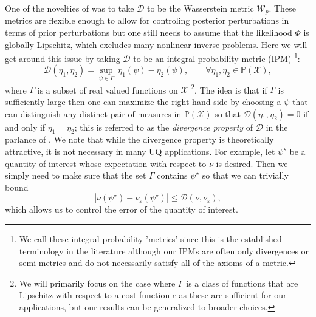 \documentclass[final]{siamart171218}
\newcommand{\mcl}{\mathcal}
\newcommand{\mbb}{\mathbb}
\newcommand{\veps}{\varepsilon}
\newcommand{\mX}{\mcl{X}}
\newcommand{\PP}{\mbb{P}}
\newcommand{\D}{\mathcal{D}}
\newcommand{\W}{\mathcal{W}}
\begin{document}
One of the novelties of \cite{sprungk} was to take $\D$ to be the Wasserstein metric $\W_p$.
These metrics are flexible enough to allow for
controling posterior perturbations in terms of prior perturbations but
one still needs to assume that the likelihood $\Phi$ is globally Lipschitz,
which excludes many nonlinear inverse problems. Here we will get around
this issue by taking $\D$ to be an integral probability metric (IPM)
\footnote{We call these integral probability 'metrics' since this is 
the established terminology in the literature although our IPMs are often 
only divergences or semi-metrics and do not necessarily satisfy all of the axioms of a metric.}:
\begin{equation}\label{IPD}
  \D(\eta_1, \eta_2) = \sup_{\psi \in \Gamma} \: \eta_1( \psi)
  - \eta_2( \psi), \qquad \forall  \eta_1,\eta_2 \in \PP(\mX),
\end{equation}
where $\Gamma$ is a subset of real valued functions on $\mX$ \footnote{We will primarily 
focus on the case where $\Gamma$ is a class of functions that are Lipschitz with respect to a 
cost function $c$ as these are sufficient for our applications, but our results can be generalized to broader choices.}.
The idea is that if $\Gamma$ is sufficiently large then one can maximize
the right hand side by choosing a $\psi$ that can distinguish any distinct pair
of measures in $\PP(\mX)$ so that $\D(\eta_1, \eta_2) = 0$ if and only if
$\eta_1 = \eta_2$; this is referred to as the {\it divergence property} of $\D$ in
the parlance of \cite{birrell2022f}. We note that while the divergence property
is theoretically attractive, it is not necessary in many UQ applications. For example,
let $\psi^\star$ be a quantity of interest whose expectation with respect to $\nu$
is desired. Then we simply need to make sure that the set $\Gamma$ contains $\psi^\star$
so that we can trivially bound 
\begin{equation*}
  |\nu(\psi^\star) - \nu_\veps(\psi^\star)| \le \D(\nu, \nu_\veps),
\end{equation*}
which allows us to control the error of the quantity of interest.
\end{document}

